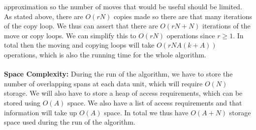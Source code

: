 approximation so the number of moves that would be useful should be
limited. As stated above, there are $O(rN)$ copies made so there are that many iterations of the copy loop. We thus
can assert that there are $O(rN + N)$ iterations of the move or copy loops. We can simplify this to $O(rN)$ operations since $r \geq 1$. In total then the moving and copying loops will take
$O(rNA (k + A))$ operations, which is also the running time for the whole algorithm. \\
\\
{\bf Space Complexity:} During the run of the algorithm, we have to store the number of overlapping spans at each data unit, which will require $O(N)$ storage. We will also have to store a heap of access requirements, which can be stored using $O(A)$ space. We also have a list of access requirements and that information will take up $O(A)$ space. In total we thus have $O(A + N)$ storage space used during the run of the algorithm. 

